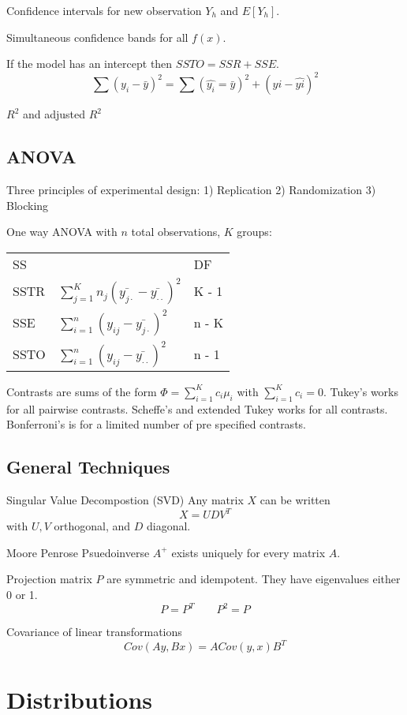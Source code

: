 \documentclass[12pt]{article}
\begin{document}
Confidence intervals for new observation $Y_h$ and $E[Y_h]$.

Simultaneous confidence bands for all $f(x)$.

If the model has an intercept then $SSTO = SSR + SSE$.
\[
    \sum (y_i - \bar{y})^2 = \sum (\hat{y_i} = \bar{y})^2 + (yi -
    \hat{yi})^2
\]

$R^2$ and adjusted $R^2$

\subsection{ANOVA}

Three principles of experimental design: 1) Replication 2) Randomization 3)
Blocking

One way ANOVA with $n$ total observations, $K$ groups:

{
\centering
\begin{tabular}{lll}
    SS   &  & DF     \\
    SSTR & $\sum_{j=1}^K n_j (\bar{y_{j \cdot}} - \bar{y_{\cdot \cdot}})^2$  & K - 1 \\
    SSE  & $\sum_{i=1}^n (y_{ij} - \bar{y_{j \cdot}})^2$  & n - K \\
    SSTO & $\sum_{i=1}^n (y_{ij} - \bar{y_{\cdot \cdot}})^2$  & n - 1 
\end{tabular}
}

Contrasts are sums of the form $\Phi = \sum_{i=1}^K c_i \mu_i$ with
$\sum_{i=1}^K c_i = 0$.
Tukey's works for all pairwise contrasts.
Scheffe's and extended Tukey works for all contrasts.
Bonferroni's is for a limited number of pre specified contrasts.

\subsection{General Techniques}

Singular Value Decompostion (SVD) Any matrix $X$ can be written
\[
    X = UDV^T
\]
with $U, V$ orthogonal, and $D$ diagonal.

Moore Penrose Psuedoinverse $A^+$ exists uniquely for every matrix $A$.

Projection matrix $P$ are symmetric and idempotent. They have eigenvalues
either 0 or 1.
\[
    P = P^T \qquad P^2 = P
\]

Covariance of linear transformations
\[
    Cov(Ay, Bx) = A Cov(y, x) B^T
\]

\section{Distributions}
\end{document}
